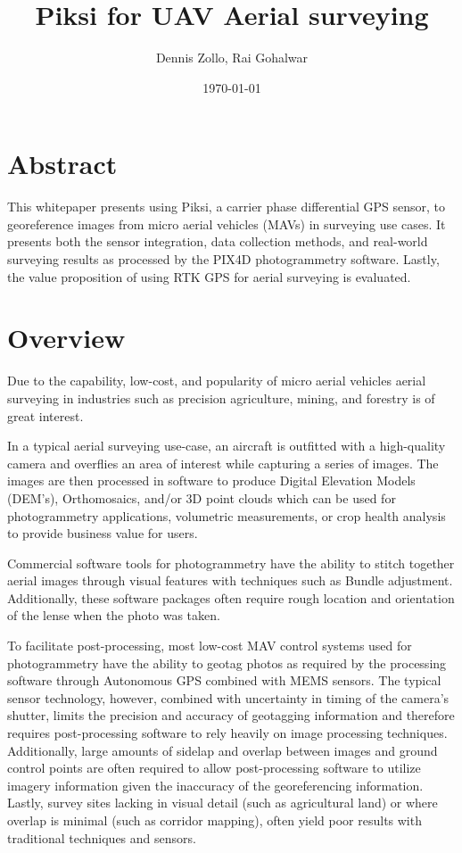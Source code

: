 \documentclass{article}
\title{Piksi for UAV Aerial surveying}
\author{Dennis Zollo, Rai Gohalwar}
\date{\today}
\begin{document}
\maketitle

\thispagestyle{firstpage}

\section{Abstract}
\label{sec:abstract}
This whitepaper presents using Piksi, a carrier phase differential GPS sensor, to georeference
 images from micro aerial vehicles (MAVs) in surveying use cases.
It presents both the sensor integration, data collection methods, and real-world surveying results
as processed by the PIX4D photogrammetry software.  Lastly, the value proposition of using RTK GPS
for aerial surveying is evaluated.
\tableofcontents
\newpage
\section{Overview}
\label{sec:Overview}
Due to the capability, low-cost, and popularity of micro aerial vehicles aerial surveying in industries such as precision agriculture, mining, and forestry is of great interest.

In a typical aerial surveying use-case, an aircraft is outfitted with a high-quality camera and
overflies an area of interest while capturing a series of images.  The images are then processed in
software to produce Digital Elevation Models (DEM's), Orthomosaics, and/or 3D point clouds which
can be used for photogrammetry applications, volumetric measurements, or crop health analysis to
provide business value for users.

Commercial software tools for photogrammetry have the ability to stitch together aerial images
through visual features with techniques such as Bundle adjustment.  Additionally, these software packages often
require rough location and orientation of the lense when the photo was taken.

To facilitate post-processing, most low-cost MAV control systems used for photogrammetry have
the ability to geotag photos as required by the processing software through Autonomous GPS combined
with MEMS sensors.  The typical sensor technology, however, combined with uncertainty in timing of the
camera's shutter, limits the precision and accuracy of geotagging information and therefore requires
post-processing software to rely heavily on image processing techniques. Additionally, large
amounts of sidelap and overlap between images and ground control points are often required to allow
post-processing software to utilize imagery information given the inaccuracy of the georeferencing
information.  Lastly, survey sites lacking in visual detail (such as agricultural land) or where
overlap is minimal (such as corridor mapping), often yield poor results with traditional techniques
and sensors.
\end{document}
